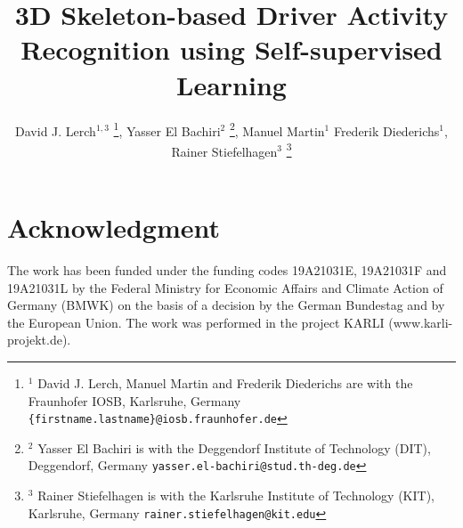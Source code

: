 \documentclass[letterpaper, 10 pt, conference]{ieeeconf}
\begin{document}
\title{\LARGE \bf 3D Skeleton-based Driver Activity Recognition using Self-supervised Learning}

\author{David J. Lerch$^{1,3}$ \thanks{$^{1}$ David J. Lerch, Manuel Martin and Frederik Diederichs are with the Fraunhofer IOSB, Karlsruhe, Germany
{\tt\small \{firstname.lastname\}@iosb.fraunhofer.de}}, 
Yasser El Bachiri$^{2}$ \thanks{$^{2}$ Yasser El Bachiri is with the Deggendorf Institute of Technology (DIT), Deggendorf, Germany {\tt\small yasser.el-bachiri@stud.th-deg.de}}, Manuel Martin$^{1}$ Frederik Diederichs$^{1}$, Rainer Stiefelhagen$^{3}$ \thanks{$^{3}$ Rainer Stiefelhagen is with the Karlsruhe Institute of Technology (KIT), Karlsruhe, Germany {\tt\small rainer.stiefelhagen@kit.edu}}}

\maketitle









\section*{Acknowledgment}
The work has been funded under the funding codes 19A21031E, 19A21031F
and 19A21031L by the Federal Ministry for Economic Affairs and Climate Action of Germany
(BMWK) on the basis of a decision by the German Bundestag and by the European Union. The
work was performed in the project KARLI (www.karli-projekt.de).

\printbibliography
\end{document}
